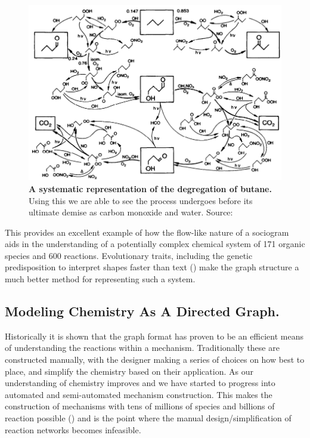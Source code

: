 \begin{figure}[h]
    \centering
        \includegraphics[width=\textwidth]{figures_c1/butane.png}

       \caption{\textbf{A systematic representation of the degregation of butane.} Using this we are able to see the process  undergoes before its ultimate demise as carbon monoxide and water. Source: \citep{butane} }
       \label{fig:butane}
\end{figure}


This provides an excellent example of how the flow-like nature of a sociogram aids in the understanding of a potentially complex chemical system of 171 organic species and 600 reactions. Evolutionary traits, including the genetic predisposition to interpret shapes faster than text (\citep{sapiens}) make the graph structure a much better method for representing such a system.





\subsection{Modeling Chemistry As A Directed Graph.}

Historically it is shown that the graph format has proven to be an efficient means of understanding the reactions within a mechanism. Traditionally these are constructed manually, with the designer making a series of choices on how best to place, and simplify the chemistry based on their application. As our understanding of chemistry improves and we have started to progress into automated and semi-automated mechanism construction. This makes the construction of mechanisms with tens of millions of species and billions of reaction possible (\citep{protocol}) and is the point where the manual design/simplification of reaction networks becomes infeasible. 


